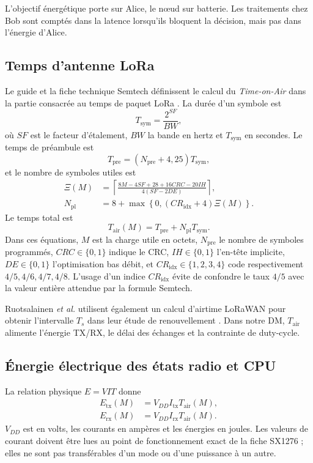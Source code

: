 \documentclass[conference,a4paper]{IEEEtran}
\newcommand{\ToA}{T_{\mathrm{air}}}
\begin{document}
L'objectif énergétique porte sur Alice, le nœud sur batterie. Les traitements chez Bob sont comptés dans la latence lorsqu'ils bloquent la décision, mais pas dans l'énergie d'Alice.

\subsection{Temps d'antenne LoRa}
Le guide et la fiche technique Semtech définissent le calcul du \emph{Time-on-Air} dans la partie consacrée au temps de paquet LoRa \cite[Sec.~4.1.1.6]{sx1276ds}. La durée d'un symbole est
\begin{equation}
    T_{\mathrm{sym}}=\frac{2^{SF}}{BW},
    \label{eq:lora-tsym}
\end{equation}
où $SF$ est le facteur d'étalement, $BW$ la bande en hertz et $T_{\mathrm{sym}}$ en secondes. Le temps de préambule est
\begin{equation}
    T_{\mathrm{pre}}=(N_{\mathrm{pre}}+4{,}25)T_{\mathrm{sym}},
    \label{eq:lora-tpre}
\end{equation}
et le nombre de symboles utiles est
\begin{align}
\Xi(M)&=\left\lceil
\frac{8M-4SF+28+16CRC-20IH}{4(SF-2DE)}
\right\rceil,
\label{eq:lora-payload-intermediate}\\
N_{\mathrm{pl}}&=8+\max\!\left\{0,
(CR_{\mathrm{idx}}+4)\Xi(M)\right\}.
\label{eq:lora-npayload}
\end{align}
Le temps total est
\begin{equation}
    \ToA(M)=T_{\mathrm{pre}}+N_{\mathrm{pl}}T_{\mathrm{sym}}.
    \label{eq:toa}
\end{equation}
Dans ces équations, $M$ est la charge utile en octets, $N_{\mathrm{pre}}$ le nombre de symboles programmés, $CRC\in\{0,1\}$ indique le CRC, $IH\in\{0,1\}$ l'en-tête implicite, $DE\in\{0,1\}$ l'optimisation bas débit, et $CR_{\mathrm{idx}}\in\{1,2,3,4\}$ code respectivement $4/5,4/6,4/7,4/8$. L'usage d'un indice $CR_{\mathrm{idx}}$ évite de confondre le taux $4/5$ avec la valeur entière attendue par la formule Semtech.

Ruotsalainen \emph{et al.} utilisent également un calcul d'airtime LoRaWAN pour obtenir l'intervalle $T_s$ dans leur étude de renouvellement \cite[Sec.~V-C]{ruotsalainen2020}. Dans notre DM, $\ToA$ alimente l'énergie TX/RX, le délai des échanges et la contrainte de duty-cycle.

\subsection{Énergie électrique des états radio et CPU}
La relation physique $E=VIT$ donne
\begin{align}
E_{\mathrm{tx}}(M)&=V_{DD}I_{\mathrm{tx}}\ToA(M),
\label{eq:energy-tx}\\
E_{\mathrm{rx}}(M)&=V_{DD}I_{\mathrm{rx}}\ToA(M).
\label{eq:energy-rx}
\end{align}
$V_{DD}$ est en volts, les courants en ampères et les énergies en joules. Les valeurs de courant doivent être lues au point de fonctionnement exact de la fiche SX1276 ; elles ne sont pas transférables d'un mode ou d'une puissance à un autre.
\end{document}
